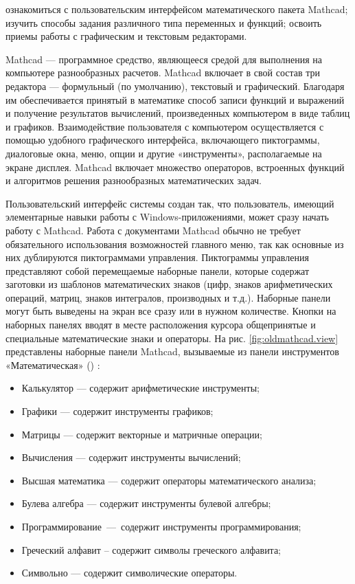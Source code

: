 
\goal ознакомиться с пользовательским интерфейсом математического пакета Mathcad; изучить способы задания различного типа переменных и функций; освоить приемы работы с графическим и текстовым редакторами.

Mathcad --- программное средство, являющееся средой для выполнения на компьютере разнообразных расчетов. Mathcad включает в свой состав три редактора --- формульный (по умолчанию), текстовый и графический. Благодаря им обеспечивается принятый в математике способ записи функций и выражений и получение результатов вычислений, произведенных компьютером в виде таблиц и графиков. Взаимодействие пользователя с компьютером осуществляется с помощью удобного графического интерфейса, включающего пиктограммы, диалоговые окна, меню, опции и другие «инструменты», располагаемые на экране дисплея. Mathcad включает множество операторов, встроенных функций и алгоритмов решения разнообразных математических задач.

Пользовательский интерфейс системы создан так, что пользователь, имеющий элементарные навыки работы с Windows-приложениями, может сразу начать работу с Mathcad. Работа с документами Mathcad обычно не требует обязательного использования возможностей главного меню, так как основные из них дублируются пиктограммами управления. Пиктограммы управления представляют собой перемещаемые наборные панели, которые содержат заготовки из шаблонов математических знаков (цифр, знаков арифметических операций, матриц, знаков интегралов, производных и т.д.). Наборные панели могут быть выведены на экран все сразу или в нужном количестве. Кнопки на наборных панелях вводят в месте расположения курсора общепринятые и специальные математические знаки и операторы. На рис. \ref{fig:oldmathcad.view} представлены наборные панели Mathcad, вызываемые из панели инструментов «Математическая» () :
\begin{itemize}
\item Калькулятор --- содержит арифметические инструменты;
\item Графики --- содержит инструменты графиков;
\item Матрицы --- содержит векторные и матричные операции;
\item Вычисления --- содержит инструменты вычислений;
\item Высшая математика --- содержит операторы математического анализа;
\item Булева алгебра --- содержит инструменты булевой алгебры;
\item Программирование --- содержит инструменты программирования;
\item Греческий алфавит – содержит символы греческого алфавита;
\item Символьно --- содержит символические операторы.
\end{itemize}

